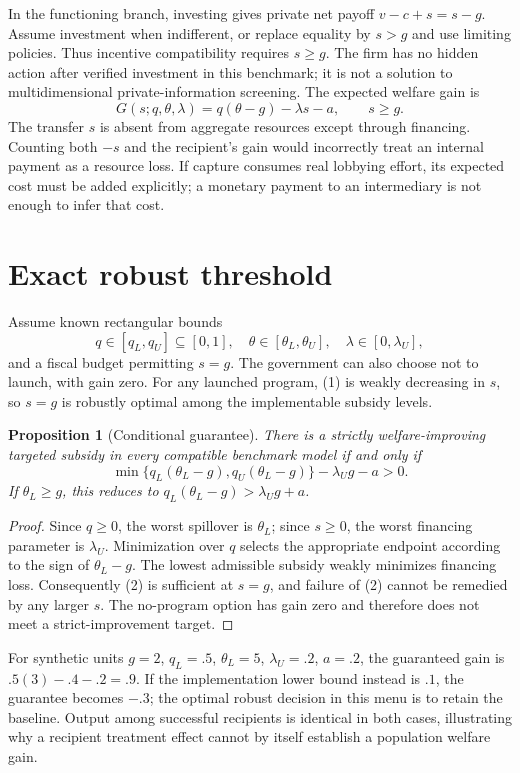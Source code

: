 \documentclass[11pt]{article}
\newtheorem{proposition}{Proposition}
\begin{document}
In the functioning branch, investing gives private net payoff $v-c+s=s-g$. Assume investment when indifferent, or replace equality by $s>g$ and use limiting policies. Thus incentive compatibility requires $s\geq g$. The firm has no hidden action after verified investment in this benchmark; it is not a solution to multidimensional private-information screening. The expected welfare gain is
\[
 G(s;q,\theta,\lambda)=q(\theta-g)-\lambda s-a,
 \qquad s\geq g.                                      \tag{1}
\]
The transfer $s$ is absent from aggregate resources except through financing. Counting both $-s$ and the recipient's gain would incorrectly treat an internal payment as a resource loss. If capture consumes real lobbying effort, its expected cost must be added explicitly; a monetary payment to an intermediary is not enough to infer that cost.

\section*{Exact robust threshold}
Assume known rectangular bounds
\[
 q\in[q_L,q_U]\subseteq[0,1],\quad
 \theta\in[\theta_L,\theta_U],\quad
 \lambda\in[0,\lambda_U],
\]
and a fiscal budget permitting $s=g$. The government can also choose not to launch, with gain zero. For any launched program, (1) is weakly decreasing in $s$, so $s=g$ is robustly optimal among the implementable subsidy levels.

\begin{proposition}[Conditional guarantee]
There is a strictly welfare-improving targeted subsidy in every compatible benchmark model if and only if
\[
 \min\{q_L(\theta_L-g),q_U(\theta_L-g)\}
       -\lambda_U g-a>0.                            \tag{2}
\]
If $\theta_L\geq g$, this reduces to
$q_L(\theta_L-g)>\lambda_Ug+a$.
\end{proposition}
\begin{proof}
Since $q\geq0$, the worst spillover is $\theta_L$; since $s\geq0$, the worst financing parameter is $\lambda_U$. Minimization over $q$ selects the appropriate endpoint according to the sign of $\theta_L-g$. The lowest admissible subsidy weakly minimizes financing loss. Consequently (2) is sufficient at $s=g$, and failure of (2) cannot be remedied by any larger $s$. The no-program option has gain zero and therefore does not meet a strict-improvement target.
\end{proof}

For synthetic units $g=2$, $q_L=.5$, $\theta_L=5$, $\lambda_U=.2$, $a=.2$, the guaranteed gain is $.5(3)-.4-.2=.9$. If the implementation lower bound instead is $.1$, the guarantee becomes $-.3$; the optimal robust decision in this menu is to retain the baseline. Output among successful recipients is identical in both cases, illustrating why a recipient treatment effect cannot by itself establish a population welfare gain.
\end{document}
